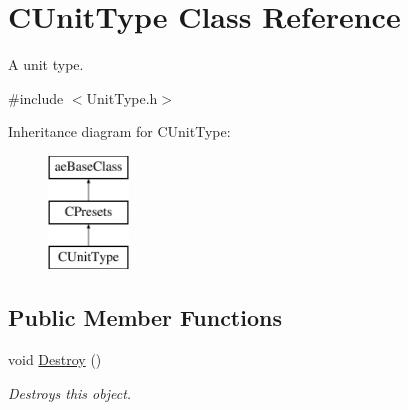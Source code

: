 \hypertarget{class_c_unit_type}{}\section{C\+Unit\+Type Class Reference}
\label{class_c_unit_type}


A unit type.  




{\ttfamily \#include $<$Unit\+Type.\+h$>$}

Inheritance diagram for C\+Unit\+Type\+:\begin{figure}[H]
\begin{center}
\leavevmode
\includegraphics[height=3.000000cm]{class_c_unit_type}
\end{center}
\end{figure}
\subsection*{Public Member Functions}
\begin{DoxyCompactItemize}
\item 
void \hyperlink{class_c_unit_type_ae6df1eb2bf236aad18b3aa90e469fe9d}{Destroy} ()\hypertarget{class_c_unit_type_ae6df1eb2bf236aad18b3aa90e469fe9d}{}\label{class_c_unit_type_ae6df1eb2bf236aad18b3aa90e469fe9d}

\begin{DoxyCompactList}\small\item\em Destroys this object. \end{DoxyCompactList}\end{DoxyCompactItemize}
